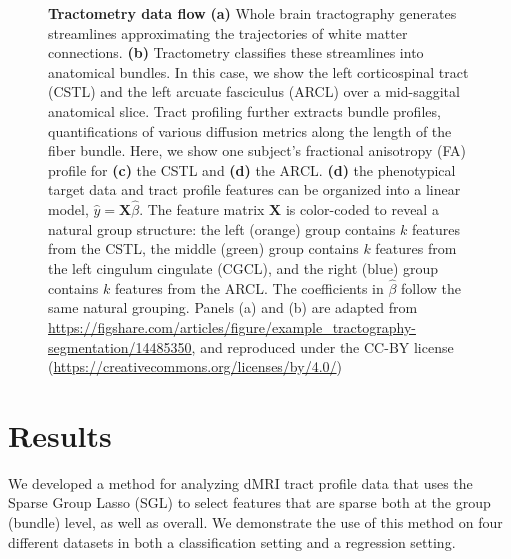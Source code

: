 \documentclass[10pt,letterpaper]{article}
\begin{document}
\begin{figure}[b!]
    {\label{fig:methods:tractogram}}
    {\label{fig:methods:cst}}
    {\label{fig:methods:tract-profile:cst}}
    {\label{fig:methods:tract-profile:fa}}
    {\label{fig:methods:group-structure}}
    \caption{\label{fig:methods}
    {\bf Tractometry data flow}
    \textbf{(a)} Whole brain tractography generates streamlines approximating
        the trajectories of white matter connections.
        \textbf{(b)} Tractometry classifies these streamlines into anatomical bundles.
        In this case, we show the left corticospinal tract (CSTL)
        and the left arcuate fasciculus (ARCL)
        over a mid-saggital anatomical slice.
        Tract profiling further extracts bundle profiles,
        quantifications of various diffusion metrics along the length of the
        fiber bundle. Here, we show one subject's fractional anisotropy (FA)
        profile for \textbf{(c)} the CSTL and \textbf{(d)} the ARCL.
        \textbf{(d)} the phenotypical target data and tract profile
        features can be organized into a linear model, $\hat{y} = \mathbf{X}
        \hat{\beta}$. The feature matrix $\mathbf{X}$ is color-coded
        to reveal a natural group structure: the left (orange) group
        contains $k$ features from the CSTL, the middle (green) group
        contains $k$ features from the left cingulum cingulate (CGCL),
        and the right (blue) group
        contains $k$ features from the ARCL.
        The coefficients in $\hat{\beta}$ follow the same natural grouping. Panels (a) and (b) are adapted from \url{https://figshare.com/articles/figure/example_tractography-segmentation/14485350}, and reproduced under the CC-BY license (\url{https://creativecommons.org/licenses/by/4.0/})
    }
\end{figure}


\section*{Results}

We developed a method for analyzing dMRI tract profile data that uses the Sparse
Group Lasso (SGL) to select features that are sparse both at the group (bundle) level, as well as overall.
We demonstrate the use of this method on four different datasets in
both a classification setting and a regression setting.
\end{document}

